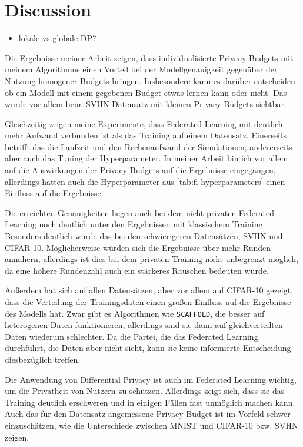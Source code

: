 \chapter{Discussion}

\begin{itemize}
	\item lokale vs globale DP?
\end{itemize}

Die Ergebnisse meiner Arbeit zeigen, dass individualisierte Privacy Budgets mit meinem Algorithmus einen Vorteil bei der Modellgenauigkeit gegenüber der Nutzung homogener Budgets bringen. Insbesondere kann es darüber entscheiden ob ein Modell mit einem gegebenen Budget etwas lernen kann oder nicht. Das wurde vor allem beim SVHN Datensatz mit kleinen Privacy Budgets sichtbar.

Gleichzeitig zeigen meine Experimente, dass Federated Learning mit deutlich mehr Aufwand verbunden ist als das Training auf einem Datensatz. Einerseits betrifft das die Laufzeit und den Rechenaufwand der Simulationen, andererseits aber auch das Tuning der Hyperparameter. In meiner Arbeit bin ich vor allem auf die Auswirkungen der Privacy Budgets auf die Ergebnisse eingegangen, allerdings hatten auch die Hyperparameter aus \autoref{tab:fl-hyperparameters} einen Einfluss auf die Ergebnisse.

Die erreichten Genauigkeiten liegen auch bei dem nicht-privaten Federated Learning noch deutlich unter den Ergebnissen mit klassischem Training. Besonders deutlich wurde das bei den schwierigeren Datensätzen, SVHN und CIFAR-10. Möglicherweise würden sich die Ergebnisse über mehr Runden annähern, allerdings ist dies bei dem privaten Training nicht unbegrenzt möglich, da eine höhere Rundenzahl auch ein stärkeres Rauschen bedeuten würde.

Außerdem hat sich auf allen Datensätzen, aber vor allem auf CIFAR-10 gezeigt, dass die Verteilung der Trainingsdaten einen großen Einfluss auf die Ergebnisse des Modells hat. Zwar gibt es Algorithmen wie \texttt{SCAFFOLD}, die besser auf heterogenen Daten funktionieren, allerdings sind sie dann auf gleichverteilten Daten wiederum schlechter. Da die Partei, die das Federated Learning durchführt, die Daten aber nicht sieht, kann sie keine informierte Entscheidung diesbezüglich treffen.

Die Anwendung von Differential Privacy ist auch im Federated Learning wichtig, um die Privatheit von Nutzern zu schützen. Allerdings zeigt sich, dass sie das Training deutlich erschweren und in einigen Fällen fast unmöglich machen kann. Auch das für den Datensatz angemessene Privacy Budget ist im Vorfeld schwer einzuschätzen, wie die Unterschiede zwischen MNIST und CIFAR-10 bzw. SVHN zeigen.

